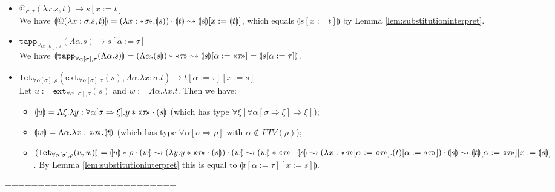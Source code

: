 \documentclass[runningheads,a4paper]{llncs}
\newcommand{\quant}[2]{\forall #1[#2]}
\newcommand{\qquant}[3]{#1 #2[#3]}
\newcommand{\typeinterpret}[1]{\text{\guillemotleft} #1\! \text{\guillemotright}}
\newcommand{\interpret}[1]{\llparenthesis #1 \rrparenthesis}
\newcommand{\arrtype}{\Rightarrow}
\newcommand{\abs}[2]{\lambda #1.#2}
\newcommand{\tabs}[2]{\Lambda #1.#2}
\newcommand{\FTV}{\mathit{FTV}}
\begin{document}
\begin{itemize}
\item $@_{\sigma,\tau}(\abs{x}{s},t) \to s[x:=t]$ \\
  We have $\interpret{@(\abs{x:\sigma}{s},t)} = (\abs{x:\typeinterpret{
  \sigma}}{\interpret{s}}) \cdot \interpret{t} \leadsto
  \interpret{s}[x:=\interpret{t}]$, which equals
  $\interpret{s[x:=t]}$ by Lemma
  \ref{lem:substitutioninterpret}.
\item $\mathtt{tapp}_{\quant{\alpha}{\sigma},\tau}(\tabs{\alpha}{s}) \to
  s[\alpha:=\tau]$ \\
  We have $\interpret{\mathtt{tapp}_{\quant{\alpha}{\sigma},
  \tau}(\tabs{\alpha}{s})} = (\tabs{\alpha}{\interpret{s}}) *
  \typeinterpret{\tau} \leadsto \interpret{s}[\alpha:=
  \typeinterpret{\tau}] = \interpret{s[\alpha:=\tau]}$.
\item $\mathtt{let}_{\qquant{\forall}{\alpha}{\sigma},\rho}(
  \mathtt{ext}_{\qquant{\forall}{\alpha}{\sigma},\tau}(s),\tabs{\alpha}{
    \abs{x:\sigma}{t}}) \to t[\alpha:=\tau][x:=s]$ \\
  Let $u := \mathtt{ext}_{\quant{\alpha}{\sigma},\tau}(s)$ and
  $w := \tabs{\alpha}{\abs{x}{t}}$.  Then we have:
  \begin{itemize}
  \item $\interpret{u} = 
    \tabs{\xi}{\abs{y:\quant{\alpha}{\sigma \arrtype \xi}}{
    y * \typeinterpret{\tau} \cdot \interpret{s}}}$ (which has type
    $\quant{\xi}{\quant{\alpha}{\sigma \arrtype \xi} \arrtype \xi}$);
  \item $\interpret{w} = \tabs{\alpha}{\abs{x:\typeinterpret{\sigma}}{
    \interpret{t}}}$ (which has type $\quant{\alpha}{\sigma \arrtype
    \rho}$ with $\alpha \notin \FTV(\rho)$);
  \item $\interpret{\mathtt{let}_{\quant{\alpha}{\sigma},\rho}(u,w)} =
    \interpret{u} * \rho \cdot \interpret{w} \leadsto
    (\abs{y}{y * \typeinterpret{\tau} \cdot \interpret{s}}) \cdot
    \interpret{w} \leadsto \interpret{w} * \typeinterpret{\tau} \cdot
    \interpret{s} \leadsto (\abs{x:\typeinterpret{\sigma}[\alpha:=
    \typeinterpret{\tau}]}{\interpret{t}[\alpha:=\typeinterpret{\tau}]})
    \cdot \interpret{s} \leadsto \interpret{t}[\alpha:=\typeinterpret{
    \tau}][x:=\interpret{s}]$.  By Lemma 
    \ref{lem:substitutioninterpret} this is equal to
    $\interpret{t[\alpha:=\tau][x:=s]}$.
  \end{itemize}
\end{itemize}

==========================
\end{document}

